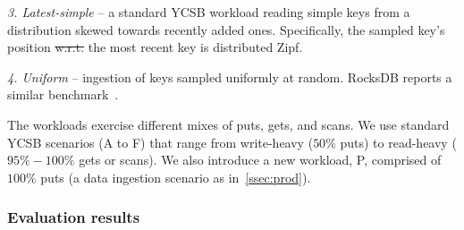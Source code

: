 \documentclass[sigplan,10pt]{acmart}
\newcommand{\inred}[1]{{\color{red}{#1}}}
\newcommand{\remove}[1]{}
\providecommand{\DIFadd}[1]{{\protect\color{blue}\uwave{#1}}} %
\providecommand{\DIFdel}[1]{{\protect\color{red}\sout{#1}}}                      %
\providecommand{\DIFaddbegin}{} %
\providecommand{\DIFaddend}{} %
\providecommand{\DIFdelbegin}{} %
\providecommand{\DIFdelend}{} %
\begin{document}
\emph{3. Latest-simple} -- a standard YCSB workload reading simple keys from a distribution skewed towards recently added ones. 
Specifically, the sampled key's position \DIFdelbegin \DIFdel{w.r.t. }\DIFdelend \DIFaddbegin \DIFadd{wrt }\DIFaddend the most recent key is distributed Zipf. 

\emph{4. Uniform} -- ingestion of keys sampled uniformly at random. RocksDB
reports a similar benchmark~\cite{rocksdb-benchmarks}. %

The workloads exercise different mixes of puts, gets, and scans. We use standard YCSB scenarios 
(A to F) that range from write-heavy ($50\%$ puts) to read-heavy ($95\%-100\%$ gets or scans). 
We also introduce a new workload, P, comprised of $100\%$ puts (a data ingestion scenario
as in~\cref{ssec:prod}).

\remove{
The YCSB workloads are different from the production workloads in~\cref{ssec:prod}, in two 
aspects: (1) \inred{the key-ordered dataset produced by YCSB's initialization is compact}, and (2) only the 
Zipf-composite synthetic workload is statistically close to production data. For this reason, our 
experiments demonstrate some phenomena that are different from~\cref{ssec:prod}.
}

\subsubsection{Evaluation results}
\DIFdelbegin %
\end{document}
